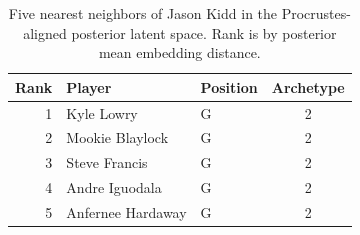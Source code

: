 \begin{table}[htbp]
  \centering\small
  \begin{tabular}{rllc}
    \toprule
    Rank & Player & Position & Archetype \\
    \midrule
    1 & Kyle Lowry & G & 2 \\
    2 & Mookie Blaylock & G & 2 \\
    3 & Steve Francis & G & 2 \\
    4 & Andre Iguodala & G & 2 \\
    5 & Anfernee Hardaway & G & 2 \\
    \bottomrule
  \end{tabular}
  \caption{Five nearest neighbors of Jason Kidd in the Procrustes-aligned posterior latent space. Rank is by posterior mean embedding distance.}
  \label{tab:Jason_Kidd_neighbors}
\end{table}

